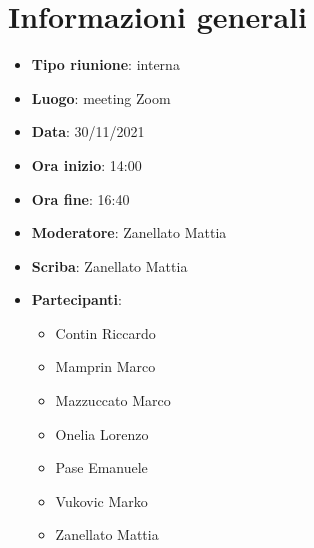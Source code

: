 \section{Informazioni generali}
\begin{itemize}
  \item \textbf{Tipo riunione}: interna
  \item \textbf{Luogo}: meeting Zoom
  \item \textbf{Data}: 30/11/2021
  \item \textbf{Ora inizio}: 14:00
  \item \textbf{Ora fine}: 16:40
  \item \textbf{Moderatore}: Zanellato Mattia
  \item \textbf{Scriba}: Zanellato Mattia
  \item \textbf{Partecipanti}:
  \begin{itemize}
    \item Contin Riccardo
    \item Mamprin Marco
    \item Mazzuccato Marco
    \item Onelia Lorenzo
    \item Pase Emanuele
    \item Vukovic Marko
    \item Zanellato Mattia
  \end{itemize}
\end{itemize}
